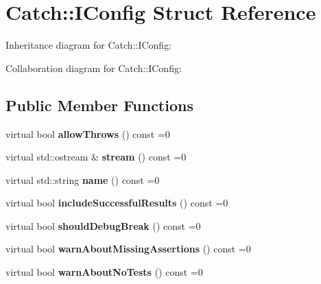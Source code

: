 \hypertarget{structCatch_1_1IConfig}{}\section{Catch\+:\+:I\+Config Struct Reference}
\label{structCatch_1_1IConfig}


Inheritance diagram for Catch\+:\+:I\+Config\+:


Collaboration diagram for Catch\+:\+:I\+Config\+:
\subsection*{Public Member Functions}
\begin{DoxyCompactItemize}
\item 
\mbox{\label{structCatch_1_1IConfig_aadb95f849359de1e6eb915aab063e542}} 
virtual bool {\bfseries allow\+Throws} () const =0
\item 
\mbox{\label{structCatch_1_1IConfig_aa4c3fe0825e7e6ebdcfa6abc7abf3617}} 
virtual std\+::ostream \& {\bfseries stream} () const =0
\item 
\mbox{\label{structCatch_1_1IConfig_aa2315800a05c19db71518b1edc39d43b}} 
virtual std\+::string {\bfseries name} () const =0
\item 
\mbox{\label{structCatch_1_1IConfig_a2f1b0391019b9ce69921527a684eab23}} 
virtual bool {\bfseries include\+Successful\+Results} () const =0
\item 
\mbox{\label{structCatch_1_1IConfig_a5b886c5aad9001e90f63a7cf0726af63}} 
virtual bool {\bfseries should\+Debug\+Break} () const =0
\item 
\mbox{\label{structCatch_1_1IConfig_a75d970c495a28e46b8e9b04a1d32149f}} 
virtual bool {\bfseries warn\+About\+Missing\+Assertions} () const =0
\item 
\mbox{\label{structCatch_1_1IConfig_a30590623e3918825f2896c2262bf6fe3}} 
virtual bool {\bfseries warn\+About\+No\+Tests} () const =0
\item 
\mbox{\label{structCatch_1_1IConfig_a363f3388a439d02217f37198eff96744}} 

\end{DoxyCompactItemize}
